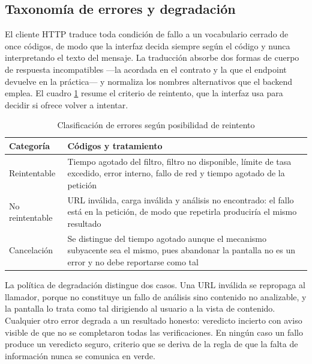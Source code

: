 \subsection{Taxonomía de errores y degradación}

El cliente HTTP traduce toda condición de fallo a un vocabulario cerrado de once
códigos, de modo que la interfaz decida siempre según el código y nunca interpretando
el texto del mensaje. La traducción absorbe dos formas de cuerpo de respuesta
incompatibles ---la acordada en el contrato y la que el endpoint devuelve en la
práctica--- y normaliza los nombres alternativos que el backend emplea. El cuadro
\ref{tab:errores} resume el criterio de reintento, que la interfaz usa para decidir si
ofrece volver a intentar.

\begin{table}[H]
    \centering
    \caption{Clasificación de errores según posibilidad de reintento}
    \begin{tabular}{@{}>{\raggedright\arraybackslash}p{3.0cm}>{\raggedright\arraybackslash}p{8.6cm}@{}}
        \toprule
        \textbf{Categoría} & \textbf{Códigos y tratamiento} \\
        \midrule
        Reintentable & Tiempo agotado del filtro, filtro no disponible, límite de tasa excedido, error interno, fallo de red y tiempo agotado de la petición \\
        No reintentable & URL inválida, carga inválida y análisis no encontrado: el fallo está en la petición, de modo que repetirla produciría el mismo resultado \\
        Cancelación & Se distingue del tiempo agotado aunque el mecanismo subyacente sea el mismo, pues abandonar la pantalla no es un error y no debe reportarse como tal \\
        \bottomrule
    \end{tabular}
    \label{tab:errores}
\end{table}

La política de degradación distingue dos casos. Una URL inválida se repropaga al
llamador, porque no constituye un fallo de análisis sino contenido no analizable, y la
pantalla lo trata como tal dirigiendo al usuario a la vista de contenido. Cualquier otro
error degrada a un resultado honesto: veredicto incierto con aviso visible de que no se
completaron todas las verificaciones. En ningún caso un fallo produce un veredicto
seguro, criterio que se deriva de la regla de que la falta de información nunca se
comunica en verde.

